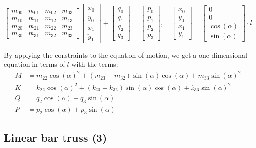 $$
\begin{bmatrix}
m_{00} & m_{01} & m_{02} & m_{03} \\
m_{10} & m_{11} & m_{12} & m_{13} \\
m_{20} & m_{21} & m_{22} & m_{23} \\
m_{30} & m_{31} & m_{32} & m_{33}
\end{bmatrix}
\begin{bmatrix}
\ddot{x}_{0} \\ \ddot{y}_{0} \\ \ddot{x}_{1} \\ \ddot{y}_{1}
\end{bmatrix}
+
\begin{bmatrix}
q_{0} \\ q_{1} \\ q_{2} \\ q_{3}
\end{bmatrix}
=
\begin{bmatrix}
p_{0} \\ p_{1} \\ p_{2} \\ p_{3}
\end{bmatrix}
,\quad
\begin{bmatrix}
x_{0} \\ y_{0} \\ x_{1} \\ y_{1}
\end{bmatrix}
=
\begin{bmatrix}
0 \\ 0 \\ \cos(\alpha) \\ \sin(\alpha)
\end{bmatrix}
\cdot l
$$

By applying the constraints to the equation of motion, we get a one-dimensional equation in terms of $l$ with the terms:
%
\begin{align*}
M &= m_{22}\cos(\alpha)^2 + (m_{23} + m_{32})\sin(\alpha)\cos(\alpha) + m_{33}\sin(\alpha)^2 \\
K &=  k_{22}\cos(\alpha)^2 + (k_{23} + k_{32})\sin(\alpha)\cos(\alpha) + k_{33}\sin(\alpha)^2 \\
Q &= q_{2}\cos(\alpha) + q_{3}\sin(\alpha) \\
P &= p_{2}\cos(\alpha) + p_{3}\sin(\alpha)
\end{align*}

\subsection*{Linear bar truss (3)}

